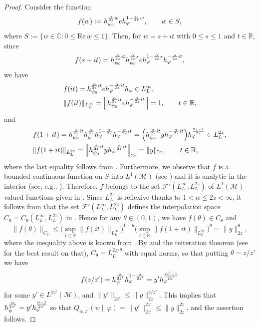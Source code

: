 \documentclass[12pt]{article}
\theoremstyle{definition}
\theoremstyle{remark}
\numberwithin{equation}{section}
\def\Me{\mathcal M}
\def\cF{\mathcal{F}}
\def\ffi{\varphi}
\def\bR{\mathbb{R}}
\def\bC{\mathbb{C}}
\def\Re{\mathrm{Re}\,}
\begin{document}
\begin{proof}
Consider the function
\begin{align}\label{F-5.14}
f(w):=h_{\psi_0}^{{\alpha\over2z}w}eh_\ffi^{1-{\alpha\over2z}w},\qquad w\in S,
\end{align}
where $S:=\{w\in\bC:0\le\Re w\le1\}$. Then, for $w=s+it$ with $0\le s\le1$ and $t\in\bR$, since
\[
f(s+it)=h_{\psi_0}^{{\alpha\over2z}it}h_{\psi_0}^{{\alpha\over2z}s}e
h_\ffi^{1-{\alpha\over2z}s}h_\ffi^{-{\alpha\over2z}it},
\]
we have
\begin{align*}
&f(it)=h_{\psi_0}^{{\alpha\over2z}it}eh_\ffi^{-{\alpha\over2z}it}h_\ffi\in L^\infty_L, \\
&\|f(it)\|_{L^\infty_L}=\Big\|h_{\psi_0}^{{\alpha\over2z}it}eh_\ffi^{-{\alpha\over2z}it}\Big\|=1,
\qquad t\in\bR,
\end{align*}
and
\begin{align*}
&f(1+it)=h_{\psi_0}^{{\alpha\over2z}it}h_\psi^{\alpha\over2z}
h_\ffi^{1-{\alpha\over2z}}h_\ffi^{-{\alpha\over2z}it}
=\Bigl(h_{\psi_0}^{{\alpha\over2z}it}yh_\ffi^{-{\alpha\over2z}it}\Bigr)h_\ffi^{2z-1\over2z}\in L^{2z}_L, \\
&\|f(1+it)\|_{L^{2z}_L}=\Big\|h_{\psi_0}^{{\alpha\over2z}it}yh_\ffi^{-{\alpha\over2z}it}\Big\|_{2z}=\|y\|_{2z},
\qquad t\in\bR,
\end{align*}
where the last equality follows from \cite[Lemma 10.1]{kosaki1984applications}. Furthermore,
we observe that $f$ is a bounded continuous function on $S$ into $L^1(\Me)$
(see \cite[Lemma 10.2]{kosaki1984applications}) and it is analytic in the interior
(see, e.g., \cite[Lemma 9.19 and Theorem 9.18(c)]{hiai2021lectures}). Therefore, $f$ belongs to the
set $\cF'(L^\infty_L,L^{2z}_L)$ of $L^1(\Me)$-valued functions given in
\cite[Definition 1.4]{kosaki1984applications}. Since $L^{2z}_L$ is reflexive thanks to $1<\alpha\le2z<\infty$,
it follows from \cite[Theorems 1.5 and Remark 3.4]{kosaki1984applications} that the set
$\cF'(L^\infty_L,L^{2z}_L)$ defines the interpolation space $C_\theta=C_\theta(L^\infty_L,L^{2z}_L)$ in
\cite[Definition 1.1]{kosaki1984applications}. Hence for any $\theta\in(0,1)$, we have $f(\theta)\in C_\theta$
and
\[
\|f(\theta)\|_{C_\theta}\le\biggl(\sup_{t\in\bR}\|f(it)\|_{L^\infty_L}\biggr)^{1-\theta}
\biggl(\sup_{t\in\bR}\|f(1+it)\|_{L^{2z}_L}\biggr)^\theta=\|y\|_{2z}^\theta,
\]
where the inequality above is known from \cite[Lemma 4.3.2(ii)]{bergh1976interpolation}. By
\cite[Theorem 1.9]{kosaki1984applications} and the reiteration theorem (see
\cite{cwikel1978complex} {for the best result on that}), $C_\theta=L^{2z/\theta}_L$
with equal norms, so that putting $\theta=z/z'$ we have
\[
f(z/z')=h_\psi^{\alpha\over2z'}h_\ffi^{1-{\alpha\over2z'}}=y'h_\ffi^{2z'-1\over2z'}
\]
for some $y'\in L^{2z'}(\Me)$, and $\|y'\|_{2z'}\le\|y\|_{2z}^{z/z'}$. This implies that
$h_\psi^{\alpha\over2z'}=y'h_\ffi^{\alpha-1\over2z'}$ so that
$Q_{\alpha,z'}(\psi\|\ffi)=\|y'\|_{2z'}^{2z'}\le\|y\|_{2z}^{2z}$, and the assertion follows.
\end{proof}
\end{document}
